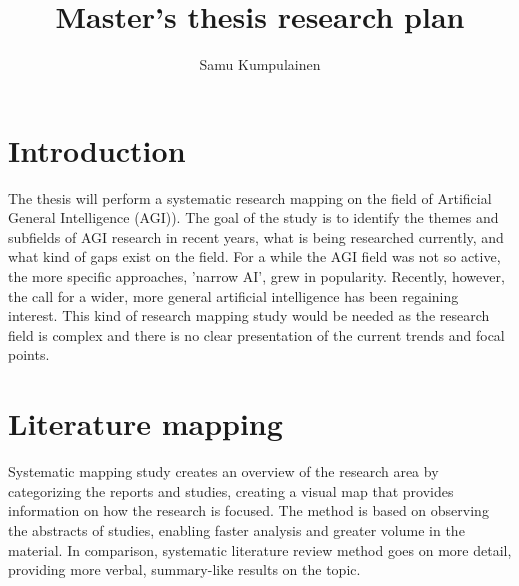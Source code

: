 \documentclass[utf8,english]{gradu3}
\begin{document}
\title{Master's thesis research plan}

\author{Samu Kumpulainen}

\maketitle

\mainmatter

\section{Introduction}
The thesis will perform a systematic research mapping on the field of Artificial General Intelligence (AGI)). The goal of the study is to identify the themes and subfields of AGI research in recent years, what is being researched currently, and what kind of gaps exist on the field. For a while the AGI field was not so active, the more specific approaches, 'narrow AI', grew in popularity. Recently, however, the call for a wider, more general artificial intelligence has been regaining interest. This kind of research mapping study would be needed as the research field is complex and there is no clear presentation of the current trends and focal points. 


\section{Literature mapping} 
Systematic mapping study creates an overview of the research area by categorizing the reports and studies, creating a visual map that provides information on how the research is focused. The method is based on observing the abstracts of studies, enabling faster analysis and greater volume in the material. In comparison, systematic literature review method goes on more detail, providing more verbal, summary-like results on the topic. 
\end{document}
